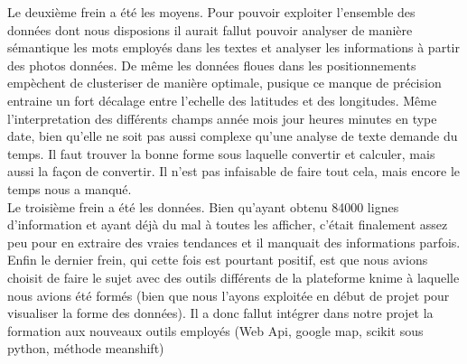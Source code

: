 Le deuxième frein a été les moyens. Pour pouvoir exploiter l'ensemble des données dont nous disposions il aurait fallut pouvoir analyser de manière sémantique les mots employés dans les textes et analyser les informations à partir des photos données. De même les données floues dans les positionnements empèchent de clusteriser de manière optimale, pusique ce manque de précision entraine un fort décalage entre l'echelle des latitudes et des longitudes. Même l'interpretation des différents champs année mois jour heures minutes en type date, bien qu'elle ne soit pas aussi complexe qu'une analyse de texte demande du temps. Il faut trouver la bonne forme sous laquelle convertir et calculer, mais aussi la façon de convertir.
Il n'est pas infaisable de faire tout cela, mais encore le temps nous a manqué.
\\

Le troisième frein a été les données. Bien qu'ayant obtenu 84000 lignes d'information et ayant déjà du mal à toutes les afficher, c'était finalement assez peu pour en extraire des vraies tendances et il manquait des informations parfois.
\\

Enfin le dernier frein, qui cette fois est pourtant positif, est que nous avions choisit de faire le sujet avec des outils différents de la plateforme knime à laquelle nous avions été formés (bien que nous l'ayons exploitée en début de projet pour visualiser la forme des données). Il a donc fallut intégrer dans notre projet la formation aux nouveaux outils employés (Web Api, google map, scikit sous python, méthode meanshift)

